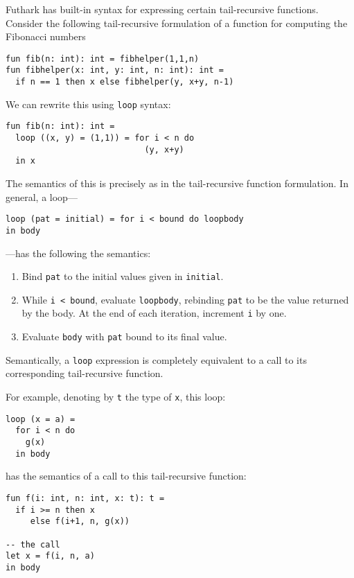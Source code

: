 \documentclass[oneside,11pt]{book}
\begin{document}
Futhark has built-in syntax for expressing certain tail-recursive
functions.  Consider the following tail-recursive formulation of a
function for computing the Fibonacci numbers

\begin{lstlisting}
fun fib(n: int): int = fibhelper(1,1,n)
fun fibhelper(x: int, y: int, n: int): int =
  if n == 1 then x else fibhelper(y, x+y, n-1)
\end{lstlisting}

We can rewrite this using \texttt{loop} syntax:

\begin{lstlisting}
fun fib(n: int): int =
  loop ((x, y) = (1,1)) = for i < n do
                            (y, x+y)
  in x
\end{lstlisting}

The semantics of this is precisely as in the tail-recursive function
formulation.  In general, a loop---

\begin{lstlisting}
loop (pat = initial) = for i < bound do loopbody
in body
\end{lstlisting}

---has the following the semantics:

\begin{enumerate}
\item Bind \texttt{pat} to the initial values given in
  \texttt{initial}.
\item While \texttt{i < bound}, evaluate \texttt{loopbody}, rebinding
  \texttt{pat} to be the value returned by the body.  At the end of
  each iteration, increment \texttt{i} by one.
\item Evaluate \texttt{body} with \texttt{pat} bound to its final
  value.
\end{enumerate}

Semantically, a \texttt{loop} expression is completely equivalent to a
call to its corresponding tail-recursive function.

For example, denoting by \texttt{t} the type of \texttt{x}, this
loop:

\begin{lstlisting}
loop (x = a) =
  for i < n do
    g(x)
  in body
\end{lstlisting}

has the semantics of a call to this tail-recursive function:

\begin{lstlisting}
fun f(i: int, n: int, x: t): t =
  if i >= n then x
     else f(i+1, n, g(x))

-- the call
let x = f(i, n, a)
in body
\end{lstlisting}
\end{document}
